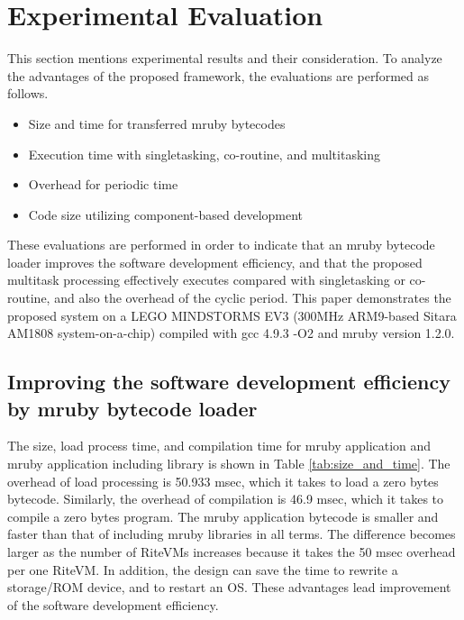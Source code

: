 \documentclass{sig-alternate-05-2015}
\begin{document}
\section{Experimental Evaluation}
\label{sec:Evaluation}
This section mentions experimental results and their consideration.
To analyze the advantages of the proposed framework, the evaluations are performed as follows.
\begin{itemize}
    \item Size and time for transferred mruby bytecodes
    \item Execution time with singletasking, co-routine, and multitasking
    \item Overhead for periodic time
    \item Code size utilizing component-based development 
\end{itemize}

These evaluations are performed in order to indicate that an mruby bytecode loader improves the software development efficiency, and that the proposed multitask processing effectively executes compared with singletasking or co-routine, and also the overhead of the cyclic period.
This paper demonstrates the proposed system on a LEGO MINDSTORMS EV3 \cite{par:EV3} (300MHz ARM9-based Sitara AM1808 system-on-a-chip) compiled with gcc 4.9.3 -O2 and mruby version 1.2.0.

\subsection{Improving the software development efficiency by mruby bytecode loader}
The size, load process time, and compilation time for mruby application and mruby application including library is shown in Table \ref{tab:size_and_time}.
The overhead of load processing is 50.933 msec, which it takes to load a zero bytes bytecode.
Similarly, the overhead of compilation is 46.9 msec, which it takes to compile a zero bytes program.
The mruby application bytecode is smaller and faster than that of including mruby libraries in all terms.
The difference becomes larger as the number of RiteVMs increases because it takes the 50 msec overhead per one RiteVM. 
In addition, the design can save the time to rewrite a storage/ROM device, and to restart an OS.
These advantages lead improvement of the software development efficiency.
\end{document}
